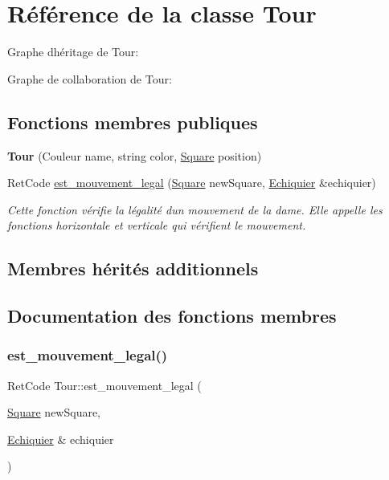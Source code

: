 \hypertarget{classTour}{}\section{Référence de la classe Tour}
\label{classTour}


Graphe d\textquotesingle{}héritage de Tour\+:


Graphe de collaboration de Tour\+:
\subsection*{Fonctions membres publiques}
\begin{DoxyCompactItemize}
\item 
\mbox{\label{classTour_a2b2ceb2ed986348f20de0dbdc246e0fc}} 
{\bfseries Tour} (Couleur name, string color, \hyperlink{classSquare}{Square} position)
\item 
Ret\+Code \hyperlink{classTour_a13fb6cfb9c1ebc615b2e0b373d1d37c0}{est\+\_\+mouvement\+\_\+legal} (\hyperlink{classSquare}{Square} new\+Square, \hyperlink{classEchiquier}{Echiquier} \&echiquier)
\begin{DoxyCompactList}\small\item\em Cette fonction vérifie la légalité d\textquotesingle{}un mouvement de la dame. Elle appelle les fonctions horizontale et verticale qui vérifient le mouvement. \end{DoxyCompactList}\end{DoxyCompactItemize}
\subsection*{Membres hérités additionnels}


\subsection{Documentation des fonctions membres}
\mbox{\label{classTour_a13fb6cfb9c1ebc615b2e0b373d1d37c0}} 
\subsubsection{\texorpdfstring{est\+\_\+mouvement\+\_\+legal()}{est\_mouvement\_legal()}}
{\footnotesize\ttfamily Ret\+Code Tour\+::est\+\_\+mouvement\+\_\+legal (\begin{DoxyParamCaption}\item[{\hyperlink{classSquare}{Square}}]{new\+Square,  }\item[{\hyperlink{classEchiquier}{Echiquier} \&}]{echiquier }\end{DoxyParamCaption})\hspace{0.3cm}{\ttfamily [virtual]}}



